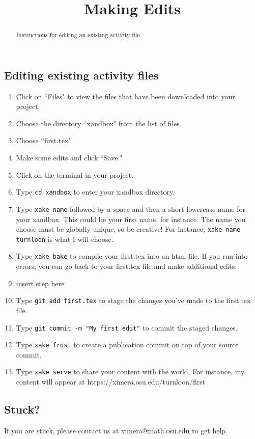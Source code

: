 \documentclass{ximera}
\title{Making Edits}
\begin{document}
\begin{abstract}
Instructions for editing an existing activity file.
\end{abstract}
\maketitle


\subsection{Editing existing activity files}

\begin{enumerate}

\item Click on ``Files" to view the files that have been downloaded into your project.
\item Choose the directory ``xandbox" from the list of files.
\item Choose ``first.tex"
\item Make some edits and click ``Save."
\item Click on the terminal in your project.
\item Type \verb!cd xandbox! to enter your xandbox directory.
\item Type \verb!xake name! followed by a space and then a short lowercase name for your xandbox.  This could be your first name, for instance.  The name you choose must be globally unique, so be creative!  For instance, \verb!xake name turnloon! is what I will choose.
\item Type \verb!xake bake! to compile your first.tex into an html file.  If you run into errors, you can go back to your first.tex file and make additional edits.
\item insert step here
\item Type \verb!git add first.tex! to stage the changes you've made to the first.tex file.
\item Type \verb!git commit -m "My first edit"! to commit the staged changes.
\item Type \verb!xake frost! to create a publication commit on top of your source commit.
\item Type \verb!xake serve! to share your content with the world.  For instance, my content will appear at https://ximera.osu.edu/turnloon/first
\end{enumerate}
\subsection{Stuck?}

If you are stuck, please contact us at ximera@math.osu.edu to get help.
\end{document}
